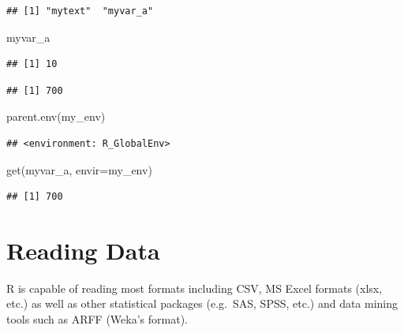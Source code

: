 \documentclass[
]{book}
\newenvironment{Shaded}{\begin{snugshade}}{\end{snugshade}}
\newcommand{\AttributeTok}[1]{\textcolor[rgb]{0.77,0.63,0.00}{#1}}
\newcommand{\FunctionTok}[1]{\textcolor[rgb]{0.00,0.00,0.00}{#1}}
\newcommand{\NormalTok}[1]{#1}
\newcommand{\SpecialCharTok}[1]{\textcolor[rgb]{0.00,0.00,0.00}{#1}}
\newcommand{\StringTok}[1]{\textcolor[rgb]{0.31,0.60,0.02}{#1}}
\begin{document}
\begin{verbatim}
## [1] "mytext"  "myvar_a"
\end{verbatim}

\begin{Shaded}
\begin{Highlighting}[]
\NormalTok{myvar\_a}
\end{Highlighting}
\end{Shaded}

\begin{verbatim}
## [1] 10
\end{verbatim}

\begin{Shaded}
\end{Shaded}

\begin{verbatim}
## [1] 700
\end{verbatim}

\begin{Shaded}
\begin{Highlighting}[]
\FunctionTok{parent.env}\NormalTok{(my\_env)}
\end{Highlighting}
\end{Shaded}

\begin{verbatim}
## <environment: R_GlobalEnv>
\end{verbatim}

\begin{Shaded}
\begin{Highlighting}[]
\FunctionTok{get}\NormalTok{(}\StringTok{\textquotesingle{}myvar\_a\textquotesingle{}}\NormalTok{, }\AttributeTok{envir=}\NormalTok{my\_env)}
\end{Highlighting}
\end{Shaded}

\begin{verbatim}
## [1] 700
\end{verbatim}

\hypertarget{reading-data}{%
\section{Reading Data}\label{reading-data}}

R is capable of reading most formats including CSV, MS Excel formats (xlsx, etc.) as well as other statistical packages (e.g.~SAS, SPSS, etc.) and data mining tools such as ARFF (Weka's format).
\end{document}
